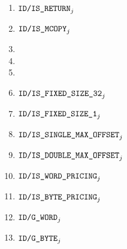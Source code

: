 \begin{description}
\begin{multicols}{2}
\begin{enumerate}
				\item $\texttt{ID}\texttt{/}\texttt{\texttt{IS\_RETURN}}             _{j}$
				\item $\texttt{ID}\texttt{/}\texttt{\texttt{IS\_MCOPY}}              _{j}$
				\item[\vspace{\fill}]
				\item[\vspace{\fill}]
				\item[\vspace{\fill}]
				\item $\texttt{ID}\texttt{/}\texttt{\texttt{IS\_FIXED\_SIZE\_32}} _{j}$
				\item $\texttt{ID}\texttt{/}\texttt{\texttt{IS\_FIXED\_SIZE\_1}}       _{j}$
				\item $\texttt{ID}\texttt{/}\texttt{\texttt{IS\_SINGLE\_MAX\_OFFSET}}    _{j}$
				\item $\texttt{ID}\texttt{/}\texttt{\texttt{IS\_DOUBLE\_MAX\_OFFSET}}    _{j}$
				\item $\texttt{ID}\texttt{/}\texttt{\texttt{IS\_WORD\_PRICING}}        _{j}$
				\item $\texttt{ID}\texttt{/}\texttt{\texttt{IS\_BYTE\_PRICING}}        _{j}$
				\item $\texttt{ID}\texttt{/}\texttt{\texttt{G\_WORD}}                _{j}$
				\item $\texttt{ID}\texttt{/}\texttt{\texttt{G\_BYTE}}                _{j}$
			\end{enumerate}
		\end{multicols}
\end{description}

